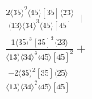 \documentclass[varwidth, border=5pt]{standalone}
\begin{document}
\begin{my}
$\begin{gathered}
\scriptscriptstyle\frac{2⟨35⟩^2⟨45⟩[35]⟨23⟩}{⟨13⟩⟨34⟩^3⟨45⟩[45]}+\\
\scriptscriptstyle\frac{1⟨35⟩^3[35]^2⟨23⟩}{⟨13⟩⟨34⟩^3⟨45⟩[45]^2}+\\
\scriptscriptstyle\frac{-2⟨35⟩^2[35]⟨25⟩}{⟨13⟩⟨34⟩^2⟨45⟩[45]}\phantom{+}
\end{gathered}$
\end{my}
\end{document}
